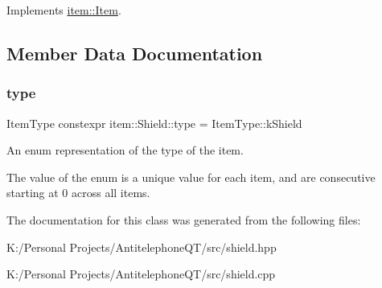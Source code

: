 Implements \hyperlink{classitem_1_1_item_afef6bdd5c1c734c67122e4118e9e1930}{item\+::\+Item}.



\subsection{Member Data Documentation}
\mbox{\label{classitem_1_1_shield_a936299d37c16f407535e373f1f879d34}} 
\subsubsection{\texorpdfstring{type}{type}}
{\footnotesize\ttfamily Item\+Type constexpr item\+::\+Shield\+::type = Item\+Type\+::k\+Shield\hspace{0.3cm}{\ttfamily [static]}}



An enum representation of the type of the item. 

The value of the enum is a unique value for each item, and are consecutive starting at 0 across all items. 

The documentation for this class was generated from the following files\+:\begin{DoxyCompactItemize}
\item 
K\+:/\+Personal Projects/\+Antitelephone\+Q\+T/src/shield.\+hpp\item 
K\+:/\+Personal Projects/\+Antitelephone\+Q\+T/src/shield.\+cpp\end{DoxyCompactItemize}
